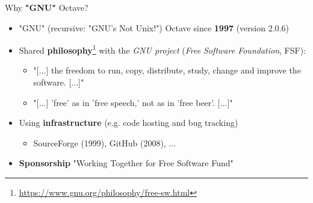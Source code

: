 \begin{frame}{Why \textbf{"GNU"} Octave?}

\begin{itemize}
\itemsep1.5em
\item
"GNU" (recursive: "GNU's Not Unix!")
Octave since \textbf{1997} (version 2.0.6)

\item
Shared
\textbf{philosophy}\footnote{\url{https://www.gnu.org/philosophy/free-sw.html}}
with the \textit{GNU project}
(\textit{Free Software Foundation}, FSF):\\[0.5em]

\begin{itemize}
\itemsep1em
\item
"[...] the freedom to run, copy, distribute, study, change
and improve the software. [...]"
\item
"[...] 'free' as in 'free speech,' not as in 'free beer'. [...]"

\end{itemize}

\item
Using \textbf{infrastructure} (e.g. code hosting and bug tracking)\\[0.5em]

\begin{itemize}
\item
SourceForge (1999), GitHub (2008), ...
\end{itemize}

\item
\textbf{Sponsorship} "Working Together for Free Software Fund"
\end{itemize}
\end{frame}
